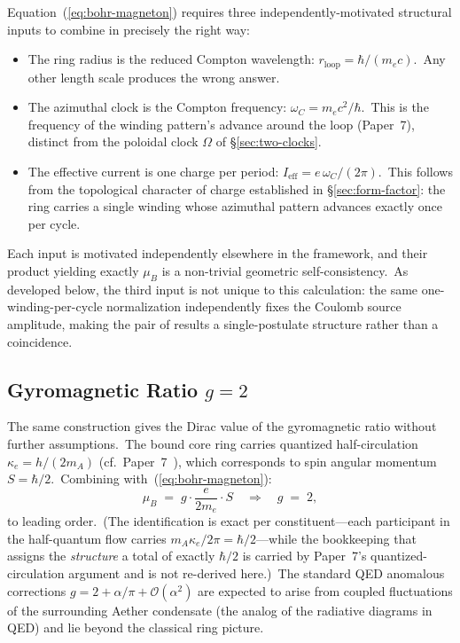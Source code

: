 \documentclass[12pt,letterpaper]{article}
\newcommand{\rloop}{r_{\mathrm{loop}}}
\begin{document}
Equation~(\ref{eq:bohr-magneton}) requires three
independently-motivated structural inputs to combine in precisely the
right way:
\begin{itemize}
\item The ring radius is the reduced Compton wavelength:
  $\rloop = \hbar/(m_e c)$.\ Any other length scale produces the wrong
  answer.
\item The azimuthal clock is the Compton frequency:
  $\omega_C = m_e c^2/\hbar$.\ This is the frequency of the winding
  pattern's advance around the loop (Paper~7), distinct from the
  poloidal clock $\Omega$ of §\ref{sec:two-clocks}.
\item The effective current is one charge per period:
  $I_{\text{eff}} = e\,\omega_C/(2\pi)$.\ This follows from the
  topological character of charge established in
  §\ref{sec:form-factor}: the ring carries a single winding whose
  azimuthal pattern advances exactly once per cycle.
\end{itemize}
Each input is motivated independently elsewhere in the framework, and
their product yielding exactly $\mu_B$ is a non-trivial geometric
self-consistency.\ As developed below, the third input is not unique to
this calculation: the same one-winding-per-cycle normalization
independently fixes the Coulomb source amplitude, making the pair of
results a single-postulate structure rather than a coincidence.

\subsection{Gyromagnetic Ratio $g = 2$}

The same construction gives the Dirac value of the gyromagnetic ratio
without further assumptions.\ The bound core ring carries quantized
half-circulation $\kappa_e = h/(2 m_A)$
(cf.\ Paper~7~\cite{otto-quantum}), which corresponds to spin angular
momentum $S = \hbar/2$.\ Combining with~(\ref{eq:bohr-magneton}):
\begin{equation}
\mu_B \;=\; g\cdot\frac{e}{2 m_e}\cdot S \quad\Longrightarrow\quad
g \;=\; 2,
\end{equation}
to leading order.\ (The identification is exact per constituent---each
participant in the half-quantum flow carries
$m_A \kappa_e/2\pi = \hbar/2$---while the bookkeeping that assigns the
\emph{structure} a total of exactly $\hbar/2$ is carried by Paper~7's
quantized-circulation argument and is not re-derived here.)\ The
standard QED anomalous corrections
$g = 2 + \alpha/\pi + \mathcal{O}(\alpha^2)$ are expected to arise from
coupled fluctuations of the surrounding Aether condensate (the analog
of the radiative diagrams in QED) and lie beyond the classical ring
picture.
\end{document}

